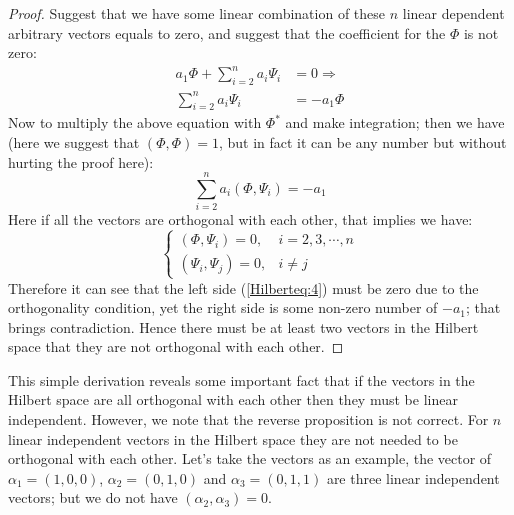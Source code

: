\begin{proof}
  Suggest that we have some linear combination of these $n$ linear
  dependent arbitrary vectors equals to zero, and suggest that the
  coefficient for the $\Phi$ is not zero:
\begin{align}\label{}
  a_{1}\Phi + \sum_{i=2}^{n}a_{i}\Psi_{i} &= 0 \Rightarrow \nonumber
  \\
  \sum_{i=2}^{n}a_{i}\Psi_{i} &=-a_{1}\Phi
\end{align}
Now to multiply the above equation with $\Phi^{*}$ and make
integration; then we have (here we suggest that $(\Phi, \Phi) = 1$,
but in fact it can be any number but without hurting the proof here):
\begin{equation}\label{Hilberteq:4}
\sum_{i=2}^{n}a_{i}(\Phi,\Psi_{i}) = -a_{1}
\end{equation}
Here if all the vectors are orthogonal with each other, that implies
we have:
\begin{equation}\label{}
\left\{
  \begin{array}{ll}
    (\Phi,\Psi_{i}) = 0, & i=2,3,\cdots, n \\
    (\Psi_{i},\Psi_{j}) = 0, & i \neq j
  \end{array}
\right.
\end{equation}
Therefore it can see that the left side (\ref{Hilberteq:4}) must be
zero due to the orthogonality condition, yet the right side is some
non-zero number of $-a_{1}$; that brings contradiction. Hence there
must be at least two vectors in the Hilbert space that they are not
orthogonal with each other. \qedhere
\end{proof}

This simple derivation reveals some important fact that if the vectors
in the Hilbert space are all orthogonal with each other then they must
be linear independent. However, we note that the reverse proposition
is not correct. For $n$ linear independent vectors in the Hilbert
space they are not needed to be orthogonal with each other. Let's take
the vectors as an example, the vector of $\alpha_{1} = (1, 0, 0)$,
$\alpha_{2} = (0, 1, 0)$ and $\alpha_{3} = (0, 1, 1)$ are three linear
independent vectors; but we do not have $(\alpha_{2}, \alpha_{3}) =
0$.


